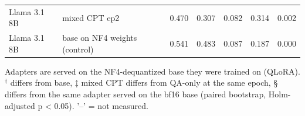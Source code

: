 \begin{table}[t]
{\begin{tabular}{llccccc}
Llama 3.1 8B & mixed CPT ep2 & 0.470 & 0.307 & 0.082 & 0.314 & 0.002 \\
Llama 3.1 8B & base on NF4 weights (control) & 0.541 & 0.483 & 0.087 & 0.187 & 0.000 \\
\bottomrule
\end{tabular}}
\par\smallskip\footnotesize Adapters are served on the NF4-dequantized base they were trained on (QLoRA). $^\dagger$ differs from base, ‡ mixed CPT differs from QA-only at the same epoch, § differs from the same adapter served on the bf16 base (paired bootstrap, Holm-adjusted p < 0.05). '–' = not measured.
\end{table}
